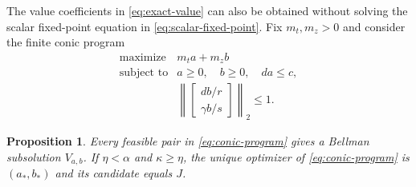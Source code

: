 \documentclass[10pt]{article}
\newtheorem{proposition}{Proposition}
\begin{document}
The value coefficients in \eqref{eq:exact-value} can also be obtained without solving the scalar fixed-point equation in \eqref{eq:scalar-fixed-point}. Fix $m_t,m_z>0$ and consider the finite conic program
\begin{equation}
\begin{array}{ll}
\text{maximize} & m_t a+m_z b\\
\text{subject to} & a\geq0,\quad b\geq0,\quad da\leq c,\\
&\displaystyle\left\|
\begin{bmatrix}db/r\\ \gamma b/s\end{bmatrix}
\right\|_2\leq1.
\end{array}
\label{eq:conic-program}
\end{equation}

\begin{proposition}
\label{prop:conic-program}
Every feasible pair in \eqref{eq:conic-program} gives a Bellman subsolution $V_{a,b}$. If $\eta<\alpha$ and $\kappa\geq\eta$, the unique optimizer of \eqref{eq:conic-program} is $(a_*,b_*)$ and its candidate equals $J$.
\end{proposition}
\end{document}
